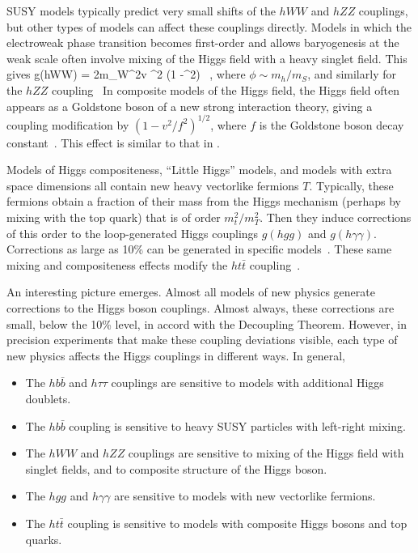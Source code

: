 SUSY models typically predict very small shifts of the $hWW$ and $hZZ$ couplings, but other types of models can affect these couplings directly.   Models in which the electroweak phase transition becomes first-order and allows baryogenesis at the weak scale often involve mixing of the Higgs field with a heavy singlet field.  This gives
\beq
           g(hWW) = {2m_W^2\over v} \cos^2\phi{} (1 -\half \phi^2) \ ,
where $\phi \sim  m_h/m_S$, and similarly for the $hZZ$ coupling~\cite{Hscalarmixing}   In composite models of the Higgs
 field, the Higgs field often appears as a Goldstone boson of a new strong interaction theory, giving a coupling modification by $(1- v^2/f^2)^{1/2}$, where $f$ is the Goldstone boson decay constant~\cite{HiggsasGB}.  This effect is similar to that in .

Models of Higgs compositeness, ``Little Higgs'' models, and models with extra space dimensions all contain new heavy vectorlike fermions $T$.   Typically, these fermions obtain a fraction of their mass from the Higgs mechanism (perhaps by mixing with the top quark) that is of order $m_t^2/m_T^2$.   Then they induce corrections of this order to the loop-generated Higgs couplings $g(hgg)$ and $g(h\gamma\gamma)$.  Corrections as large as 10\% can be generated in specific models~\cite{Han:2003gf}.   These same mixing and compositeness effects modify the $ht\bar t$ coupling~\cite{Agashe:2004rs}.

An interesting picture emerges.   Almost all models of new physics generate corrections to the Higgs boson couplings.   Almost always, these corrections are small, below the 10\% level, in accord with the Decoupling Theorem.  However, in precision experiments that make these coupling deviations  visible, each type of new physics affects the Higgs couplings in different ways.  In general,
\begin{itemize}
\item The $hb\bar b$ and $h\tau\tau$ couplings are sensitive to models with additional Higgs doublets.
\item The $hb\bar b$ coupling is sensitive to heavy SUSY particles with left-right mixing.
\item The $hWW$ and $hZZ$ couplings are sensitive to mixing of the Higgs field with singlet fields, and to composite structure of the Higgs boson.
\item The $hgg$ and $h\gamma\gamma$ are sensitive to models with new vectorlike fermions.
\item The $ht\bar t$ coupling is sensitive to models with composite Higgs bosons and top quarks.
\end{itemize}

